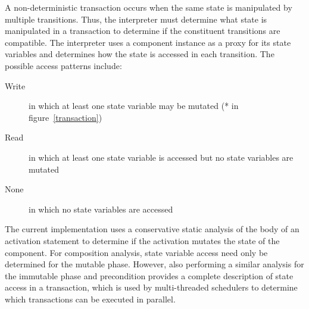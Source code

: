 A non-deterministic transaction occurs when the same state is manipulated by multiple transitions.
Thus, the interpreter must determine what state is manipulated in a transaction to determine if the constituent transitions are compatible.
The interpreter uses a component instance as a proxy for its state variables and determines how the state is accessed in each transition.
The possible access patterns include:
\begin{description}
  \item[Write] in which at least one state variable may be mutated (* in figure~\ref{transaction})
  \item[Read] in which at least one state variable is accessed but no state variables are mutated
  \item[None] in which no state variables are accessed
\end{description}
The current implementation uses a conservative static analysis of the body of an activation statement to determine if the activation mutates the state of the component.
For composition analysis, state variable access need only be determined for the mutable phase.
However, also performing a similar analysis for the immutable phase and precondition provides a complete description of state access in a transaction, which is used by multi-threaded schedulers to determine which transactions can be executed in parallel.

